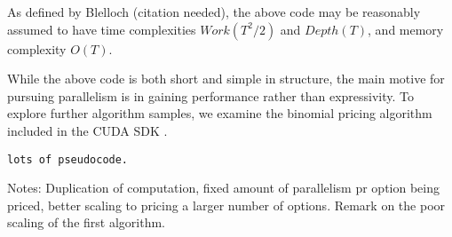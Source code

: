  As defined by Blelloch (citation needed), the above code
may be reasonably assumed to have time complexities $Work(T^2/2)$ and
$Depth(T)$, and memory complexity $O(T)$.

While the above code is both short and simple in structure, the main motive for
pursuing parallelism is in gaining performance rather than expressivity.  To
explore further algorithm samples, we examine the binomial pricing algorithm
included in the CUDA SDK \cite{CUDAbinomial}.

\begin{verbatim}
lots of pseudocode.
\end{verbatim}

Notes: Duplication of computation, fixed amount of parallelism pr option being
priced, better scaling to pricing a larger number of options. Remark on the
poor scaling of the first algorithm.

